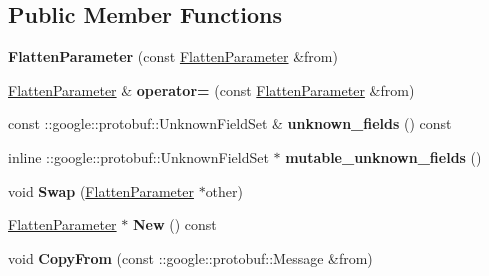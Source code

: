 \subsection*{Public Member Functions}
\begin{DoxyCompactItemize}
\item 
\mbox{\label{classcaffe_1_1_flatten_parameter_a61a1ce77e42721e9b13257046afb3da0}} 
{\bfseries Flatten\+Parameter} (const \mbox{\hyperlink{classcaffe_1_1_flatten_parameter}{Flatten\+Parameter}} \&from)
\item 
\mbox{\label{classcaffe_1_1_flatten_parameter_a7774ba2dc490fc3fa1a08010565bb0c0}} 
\mbox{\hyperlink{classcaffe_1_1_flatten_parameter}{Flatten\+Parameter}} \& {\bfseries operator=} (const \mbox{\hyperlink{classcaffe_1_1_flatten_parameter}{Flatten\+Parameter}} \&from)
\item 
\mbox{\label{classcaffe_1_1_flatten_parameter_a3f3b3f3795f6f2c219e6aa0c7da9f711}} 
const \+::google\+::protobuf\+::\+Unknown\+Field\+Set \& {\bfseries unknown\+\_\+fields} () const
\item 
\mbox{\label{classcaffe_1_1_flatten_parameter_a0126476f5c108caf0f33db2b85e985ff}} 
inline \+::google\+::protobuf\+::\+Unknown\+Field\+Set $\ast$ {\bfseries mutable\+\_\+unknown\+\_\+fields} ()
\item 
\mbox{\label{classcaffe_1_1_flatten_parameter_a9b701c551e4f9caadff6f27c6d4f4b6c}} 
void {\bfseries Swap} (\mbox{\hyperlink{classcaffe_1_1_flatten_parameter}{Flatten\+Parameter}} $\ast$other)
\item 
\mbox{\label{classcaffe_1_1_flatten_parameter_ab65ac61c49cfb9003876bc3244a96ed2}} 
\mbox{\hyperlink{classcaffe_1_1_flatten_parameter}{Flatten\+Parameter}} $\ast$ {\bfseries New} () const
\item 
\mbox{\label{classcaffe_1_1_flatten_parameter_aa783bc081f0b4eb773a021d711ef27c0}} 
void {\bfseries Copy\+From} (const \+::google\+::protobuf\+::\+Message \&from)
\item 
\mbox{\label{classcaffe_1_1_flatten_parameter_ac5a7e3654ea094ea9822bc72af84a27b}} 

\end{DoxyCompactItemize}

